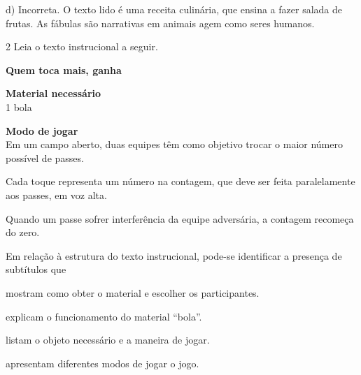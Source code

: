 \begin{escolha}
\begin{escolha}
{d) Incorreta. O texto lido é uma receita culinária, que ensina a fazer 
salada de frutas. As fábulas são narrativas em animais agem como seres
humanos.}

\num{2} Leia o texto instrucional a seguir.


\textbf{Quem toca mais, ganha}

\textbf{Material necessário}\\
1 bola

\textbf{Modo de jogar}\\
Em um campo aberto, duas equipes têm como
objetivo trocar o maior número possível de passes.

Cada toque representa um número na contagem, que deve ser feita
paralelamente aos passes, em voz alta.

Quando um passe sofrer interferência da equipe adversária, a contagem
recomeça do zero.


Em relação à estrutura do texto instrucional, pode-se identificar a
presença de subtítulos que

\begin{escolha}
\item mostram como obter o material e escolher os participantes.

\item explicam o funcionamento do material ``bola''.

\item listam o objeto necessário e a maneira de jogar.

\item apresentam diferentes modos de jogar o jogo.
\end{escolha}



\end{escolha}
\end{escolha}
